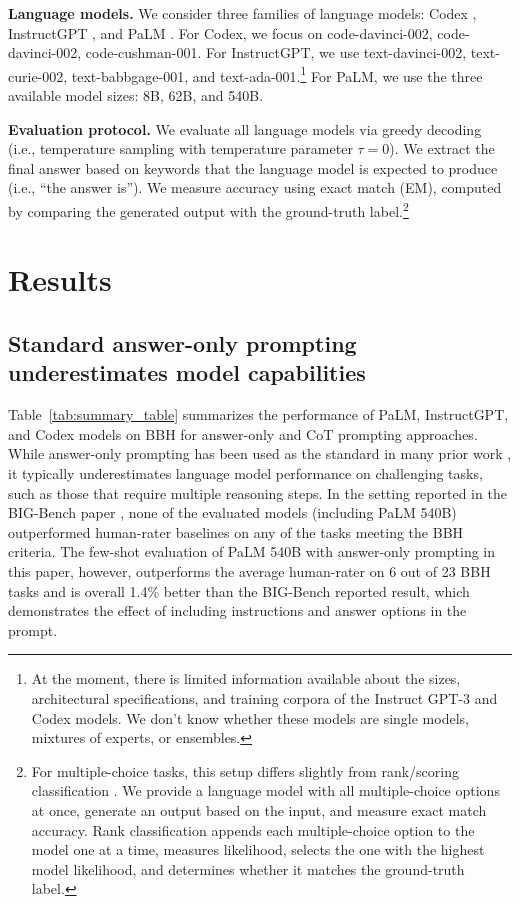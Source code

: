 \textbf{Language models.} We consider three families of language models: Codex \citep{chen2021codex}, InstructGPT \citep{ouyang2022training,brown2020language}, and PaLM \citep{chowdhery2022palm}. For Codex, we focus on code-davinci-002, code-davinci-002, code-cushman-001. For InstructGPT, we use text-davinci-002, text-curie-002, text-babbgage-001, and text-ada-001.\footnote{At the moment, there is limited information available about the sizes, architectural specifications, and training corpora of the Instruct GPT-3 and Codex models. We don't know whether these models are single models, mixtures of experts, or ensembles.} For PaLM, we use the three available model sizes: 8B, 62B, and 540B.

\textbf{Evaluation protocol.} We evaluate all language models via greedy decoding (i.e., temperature sampling with temperature parameter $\tau=0$). 
We extract the final answer based on keywords that the language model is expected to produce (i.e., ``the answer is''). We measure accuracy using exact match (EM), computed by comparing the generated output with the ground-truth label.\footnote{For multiple-choice tasks, this setup differs slightly from rank/scoring classification \citep{brown2020language,srivastava2022beyond,lampinen2022can}. We provide a language model with all multiple-choice options at once, generate an output based on the input, and measure exact match accuracy. Rank classification appends each multiple-choice option to the model one at a time, measures likelihood, selects the one with the highest model likelihood, and determines whether it matches the ground-truth label.} 

\section{Results}
\label{sec:results}

\subsection{Standard answer-only prompting underestimates model capabilities}
\label{sec:answer-only-underestimates-model-capabilities}
Table~\ref{tab:summary_table} summarizes the performance of PaLM, InstructGPT, and Codex models on BBH for answer-only and CoT prompting approaches. While answer-only prompting has been used as the standard in many prior work \citep{brown2020language,rae2021scaling,hoffmann2022training,srivastava2022beyond}, it typically underestimates language model performance on challenging tasks, such as those that require multiple reasoning steps. In the setting reported in the BIG-Bench paper \citep{srivastava2022beyond}, none of the evaluated models (including PaLM 540B) outperformed human-rater baselines on any of the tasks meeting the BBH criteria. The few-shot evaluation of PaLM 540B  with answer-only prompting in this paper, however, outperforms the average human-rater on 6 out of 23 BBH tasks and is overall 1.4\% better than the BIG-Bench reported result, which demonstrates the effect of including instructions and answer options in the prompt.

